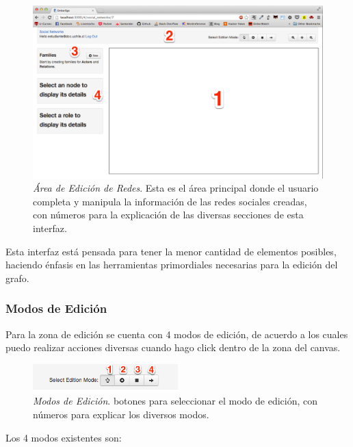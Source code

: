 \begin{figure}[H]
  \includegraphics[width=1.0\textwidth]{images/area_edicion_redes.png}
  \caption[Área de Edición de Redes]{\emph{Área de Edición de Redes}. Esta es el área principal donde el usuario completa y manipula la información de las redes sociales creadas, con números para la explicación de las diversas secciones de esta interfaz.}
  \label{area_edicion_redes}
\end{figure}

Esta interfaz está pensada para tener la menor cantidad de elementos posibles, haciendo énfasis en las herramientas primordiales necesarias para la edición del grafo.

\subsubsection{Modos de Edición} %
\label{ssub:modos_de_edicion}

Para la zona de edición se cuenta con 4 modos de edición, de acuerdo a los cuales puedo realizar acciones diversas cuando hago click dentro de la zona del canvas.

\begin{figure}[H]
  \centering
  \includegraphics[width=0.5\textwidth]{images/modos_edicion.png}
  \caption[Modos de Edición]{\emph{Modos de Edición}. botones para seleccionar el modo de edición, con números para explicar los diversos modos.}
  \label{modos_edicion}
\end{figure}

Los 4 modos existentes son:


